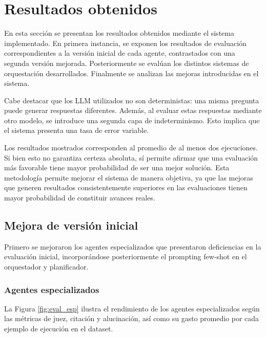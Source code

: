 \section{Resultados obtenidos}
En esta sección se presentan los resultados obtenidos mediante el sistema implementado. En primera instancia, se exponen los resultados de evaluación correspondientes a la versión inicial de cada agente, contrastados con una segunda versión mejorada. Posteriormente se evalúan los distintos sistemas de orquestación desarrollados. Finalmente se analizan las mejoras introducidas en el sistema.

Cabe destacar que los LLM utilizados no son deterministas: una misma pregunta puede generar respuestas diferentes. Además, al evaluar estas respuestas mediante otro modelo, se introduce una segunda capa de indeterminismo. Esto implica que el sistema presenta una tasa de error variable.

Los resultados mostrados corresponden al promedio de al menos dos ejecuciones. Si bien esto no garantiza certeza absoluta, sí permite afirmar que una evaluación más favorable tiene mayor probabilidad de ser una mejor solución. Esta metodología permite mejorar el sistema de manera objetiva, ya que las mejoras que generen resultados consistentemente superiores en las evaluaciones tienen mayor probabilidad de constituir avances reales.

\subsection{Mejora de versión inicial}
Primero se mejoraron los agentes especializados que presentaron deficiencias en la evaluación inicial, incorporándose posteriormente el prompting few-shot en el orquestador y planificador.

\subsubsection{Agentes especializados}
La Figura \ref{fig:eval_esp} ilustra el rendimiento de los agentes especializados según las métricas de juez, citación y alucinación, así como su gasto promedio por cada ejemplo de ejecución en el dataset.

